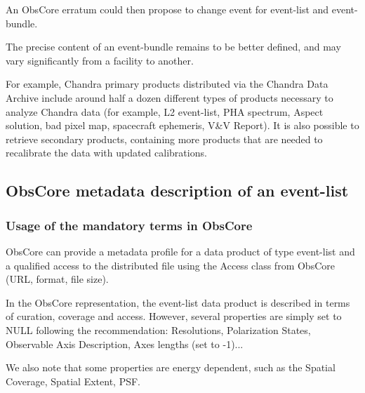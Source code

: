 \documentclass[11pt,a4paper]{ivoa}
\begin{document}
An ObsCore erratum could then propose to change event for event-list and event-bundle.

The precise content of an event-bundle remains to be better defined, and may vary significantly from a facility to another.

For example, Chandra primary products distributed via the Chandra Data Archive include around half a dozen different types of products necessary to analyze Chandra data (for example, L2 event-list, PHA spectrum, Aspect solution, bad pixel map, spacecraft ephemeris, V\&V Report). It is also possible to retrieve secondary products, containing more products that are needed to recalibrate the data with updated calibrations.


\subsection{ObsCore metadata description of an event-list}
\label{sec:obscore}

%


\subsubsection{Usage of the mandatory terms in ObsCore}

ObsCore \citep{2017ivoa.spec.0509L} can provide a metadata profile for a data product of type event-list and a qualified access to the distributed file using the Access class from ObsCore (URL, format, file size).

In the ObsCore representation, the event-list data product is described in terms of curation, coverage and access. However, several properties are simply set to NULL following the recommendation: Resolutions, Polarization States, Observable Axis Description, Axes lengths (set to -1)...

We also note that some properties are energy dependent, such as the Spatial Coverage, Spatial Extent, PSF.

\end{document}
